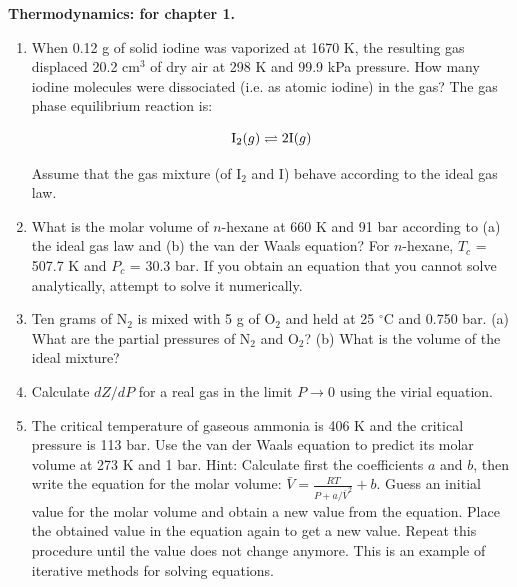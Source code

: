 \noindent
\textbf{Thermodynamics:
 for chapter 1.}\\

\begin{enumerate}
\item When 0.12 g of solid iodine was vaporized at 1670 K, the resulting gas displaced 20.2 cm$^3$ of dry air at 298 K and 99.9 kPa pressure. How many iodine molecules were dissociated (i.e. as atomic iodine) in the gas? The gas phase equilibrium reaction is:

$$\textnormal{I}_2(g) \rightleftharpoons 2\textnormal{I}(g)$$

Assume that the gas mixture (of I$_2$ and I) behave according to the ideal gas law.


\item What is the molar volume of $n$-hexane at 660 K and 91 bar according to (a) the ideal gas law and (b) the van der Waals equation? For $n$-hexane, $T_c$ = 507.7 K and $P_c$ = 30.3 bar. If you obtain an equation that you cannot solve analytically, attempt to solve it
numerically.


\item Ten grams of N$_2$ is mixed with 5 g of O$_2$ and held at 25 $^\circ$C and 0.750 bar. (a) What are the partial pressures of N$_2$ and O$_2$? (b) What is the volume of the ideal mixture?


\item Calculate $dZ / dP$ for a real gas in the limit $P \rightarrow 0$ using the virial equation.


\item The critical temperature of gaseous ammonia is 406 K and the critical pressure is 113 bar. Use the van der Waals equation to predict its molar volume at 273 K and 1 bar. Hint: Calculate first the coefficients $a$ and $b$, then write the equation for the molar
volume: $\bar{V} = \frac{RT}{P + a / \bar{V}^2} + b$. Guess an initial value for the molar volume and obtain a new value from the equation. Place the obtained value in the equation again to get a new value. Repeat this procedure until the value does not change anymore. This is an example of iterative methods for solving equations.


\end{enumerate}

